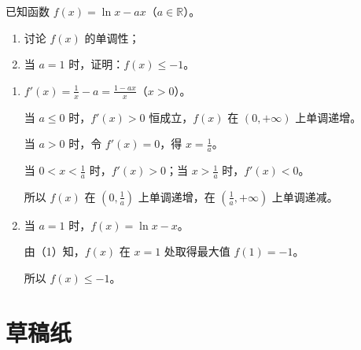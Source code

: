 \documentclass{exam-zh}
\begin{document}
\begin{problem}[points = 12]
  已知函数 $f(x) = \ln x - ax$（$a \in \mathbb{R}$）。

  \begin{enumerate}
    \item 讨论 $f(x)$ 的单调性；
    \item 当 $a = 1$ 时，证明：$f(x) \leq -1$。
  \end{enumerate}

  \begin{solution}
    \begin{enumerate}
      \item $f'(x) = \frac{1}{x} - a = \frac{1 - ax}{x}$（$x > 0$）。

      当 $a \leq 0$ 时，$f'(x) > 0$ 恒成立，$f(x)$ 在 $(0, +\infty)$ 上单调递增。

      当 $a > 0$ 时，令 $f'(x) = 0$，得 $x = \frac{1}{a}$。

      当 $0 < x < \frac{1}{a}$ 时，$f'(x) > 0$；当 $x > \frac{1}{a}$ 时，$f'(x) < 0$。

      所以 $f(x)$ 在 $(0, \frac{1}{a})$ 上单调递增，在 $(\frac{1}{a}, +\infty)$ 上单调递减。

      \item 当 $a = 1$ 时，$f(x) = \ln x - x$。

      由（1）知，$f(x)$ 在 $x = 1$ 处取得最大值 $f(1) = -1$。

      所以 $f(x) \leq -1$。
    \end{enumerate}
  \end{solution}
\end{problem}


\newpage
\section*{草稿纸}

\draftpaper
\end{document}
